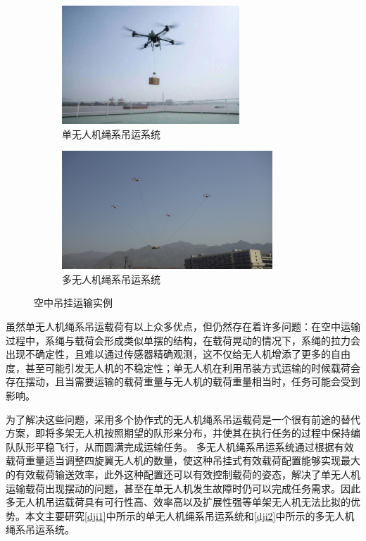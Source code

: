 \documentclass[lang=chs, degree=master, blindreview=false, winfonts=true]{yanputhesis}
\begin{document}
\begin{figure}[htb!]
    \centering
	\hspace{-1.0cm}
    \begin{minipage}[t]{0.96\textwidth}
        \centering
        \begin{subfigure}[t]{0.47\textwidth}
            \centering
            \includegraphics[height = 1.75in]{picture/dji1.jpg}
            \caption{单无人机绳系吊运系统\label{dji1}}
        \end{subfigure}\hfill
        \begin{subfigure}[t]{0.47\textwidth}
            \centering
            \includegraphics[height = 1.75in]{picture/dji2.png}
            \caption{多无人机绳系吊运系统\label{dji2}}
        \end{subfigure}
    \end{minipage}
    \caption{空中吊挂运输实例}
\end{figure}
虽然单无人机绳系吊运载荷有以上众多优点，但仍然存在着许多问题：在空中运输过程中，系绳与载荷会形成类似单摆的结构，在载荷晃动的情况下，系绳的拉力会出现不确定性，且难以通过传感器精确观测，这不仅给无人机增添了更多的自由度，甚至可能引发无人机的不稳定性；单无人机在利用吊装方式运输的时候载荷会存在摆动，且当需要运输的载荷重量与无人机的载荷重量相当时，任务可能会受到影响。

为了解决这些问题，采用多个协作式的无人机绳系吊运载荷是一个很有前途的替代方案，即将多架无人机按照期望的队形来分布，并使其在执行任务的过程中保持编队队形平稳飞行，从而圆满完成运输任务。
多无人机绳系吊运系统通过根据有效载荷重量适当调整四旋翼无人机的数量，使这种吊挂式有效载荷配置能够实现最大的有效载荷输送效率，此外这种配置还可以有效控制载荷的姿态，解决了单无人机运输载荷出现摆动的问题，甚至在单无人机发生故障时仍可以完成任务需求。因此多无人机吊运载荷具有可行性高、效率高以及扩展性强等单架无人机无法比拟的优势。本文主要研究\autoref{dji1}中所示的单无人机绳系吊运系统和\autoref{dji2}中所示的多无人机绳系吊运系统。
\end{document}
